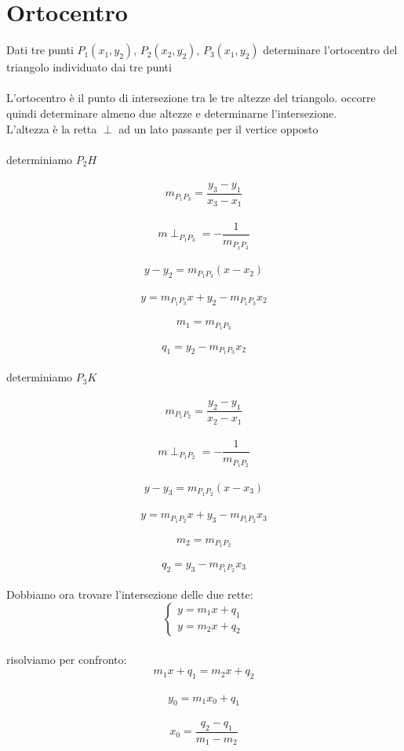 \documentclass[12pt]{book}
\begin{document}
				\section{Ortocentro}
				Dati tre punti
				$P_1\left(x_1,y_2\right)$, $P_2\left(x_2,y_2\right)$, $P_3\left(x_1,y_2\right)$ determinare l'ortocentro del triangolo individuato dai tre punti
				\\
				\\
				L'ortocentro è il punto di intersezione tra le tre altezze del triangolo. occorre quindi determinare almeno due altezze e determinarne l'intersezione.
				\\
				L'altezza è la retta $\perp$ ad un lato passante per il vertice opposto 
				\\
				\\
				determiniamo $P_2H$
				\\
				\\
				\[m_{P_1P_3}=\frac{y_3-y_1}{x_3-x_1}\]
				\\
				\[m\perp_{P_1P_3}=-\frac{1}{m_{P_1P_3}}\]
				\\
				\[y-y_2=m_{P_1P_3}(x-x_2)\]
				\\
				\[y=m_{P_1P_3}x+y_2-m_{P_1P_3}x_2\]
				\\
				\[m_1=m_{P_1P_3}\]
				\\
				\[q_1=y_2-m_{P_1P_3}x_2\]
				\\
				determiniamo $P_3K$
				\\
				\\
				\[m_{P_1P_2}=\frac{y_2-y_1}{x_2-x_1}\]
				\\
				\[m\perp_{P_1P_2}=-\frac{1}{m_{P_1P_2}}\]
				\\
				\[y-y_3=m_{P_1P_2}(x-x_3)\]
				\\
				\[y=m_{P_1P_2}x+y_3-m_{P_1P_2}x_3\]
				\\
				\[m_2=m_{P_1P_2}\]
				\\
				\[q_2=y_3-m_{P_1P_2}x_3\]
				\\
				Dobbiamo ora trovare l'intersezione delle due rette:
				\\
				\[  \begin{cases}
					y=m_1x+q_1\\
					y=m_2x+q_2
				\end{cases} \]
				\\
				risolviamo per confronto:
				\\
				\[m_1x+q_1=m_2x+q_2\]
				\\
				\[y_0=m_1x_0+q_1\]
				\\
				\[x_0=\frac{q_2-q_1}{m_1-m_2}\]
\end{document}
